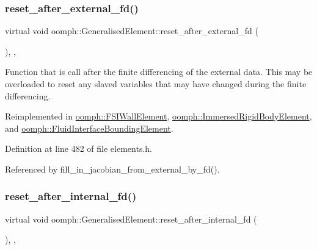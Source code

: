 \subsubsection{\texorpdfstring{reset\+\_\+after\+\_\+external\+\_\+fd()}{reset\_after\_external\_fd()}}
{\footnotesize\ttfamily virtual void oomph\+::\+Generalised\+Element\+::reset\+\_\+after\+\_\+external\+\_\+fd (\begin{DoxyParamCaption}{ }\end{DoxyParamCaption})\hspace{0.3cm}{\ttfamily [inline]}, {\ttfamily [protected]}, {\ttfamily [virtual]}}



Function that is call after the finite differencing of the external data. This may be overloaded to reset any slaved variables that may have changed during the finite differencing. 



Reimplemented in \hyperlink{classoomph_1_1FSIWallElement_a2b1dc28716968b01e7bf5513ea4446c5}{oomph\+::\+F\+S\+I\+Wall\+Element}, \hyperlink{classoomph_1_1ImmersedRigidBodyElement_a7812d2be5a267c95e954bc7c5f359fc6}{oomph\+::\+Immersed\+Rigid\+Body\+Element}, and \hyperlink{classoomph_1_1FluidInterfaceBoundingElement_a6b0de0d11dfcfc912e2f56fbd6359ebe}{oomph\+::\+Fluid\+Interface\+Bounding\+Element}.



Definition at line 482 of file elements.\+h.



Referenced by fill\+\_\+in\+\_\+jacobian\+\_\+from\+\_\+external\+\_\+by\+\_\+fd().

\mbox{\label{classoomph_1_1GeneralisedElement_ab3e2e13d219c132488fb05e9596cb43f}} 
\subsubsection{\texorpdfstring{reset\+\_\+after\+\_\+internal\+\_\+fd()}{reset\_after\_internal\_fd()}}
{\footnotesize\ttfamily virtual void oomph\+::\+Generalised\+Element\+::reset\+\_\+after\+\_\+internal\+\_\+fd (\begin{DoxyParamCaption}{ }\end{DoxyParamCaption})\hspace{0.3cm}{\ttfamily [inline]}, {\ttfamily [protected]}, {\ttfamily [virtual]}}



